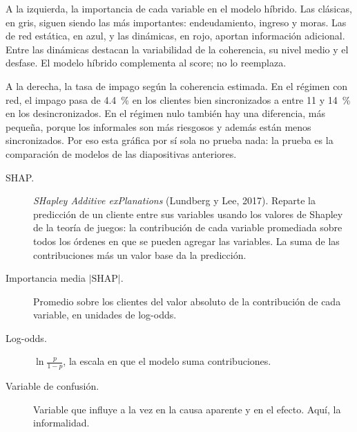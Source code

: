 \begin{decir}
A la izquierda, la importancia de cada variable en el modelo híbrido. Las clásicas,
en gris, siguen siendo las más importantes: endeudamiento, ingreso y moras. Las de red
estática, en azul, y las dinámicas, en rojo, aportan información adicional. Entre las
dinámicas destacan la variabilidad de la coherencia, su nivel medio y el desfase. El
modelo híbrido complementa al score; no lo reemplaza.

A la derecha, la tasa de impago según la coherencia estimada. En el régimen con red, el
impago pasa de 4.4~\% en los clientes bien sincronizados a entre 11 y 14~\% en los
desincronizados. En el régimen nulo también hay una diferencia, más pequeña, porque los
informales son más riesgosos y además están menos sincronizados. Por eso esta gráfica
por sí sola no prueba nada: la prueba es la comparación de modelos de las diapositivas
anteriores.
\end{decir}
\begin{terminos}
\begin{description}
\item[SHAP.] \emph{SHapley Additive exPlanations} (Lundberg y Lee, 2017). Reparte la
predicción de un cliente entre sus variables usando los valores de Shapley de la teoría
de juegos: la contribución de cada variable promediada sobre todos los órdenes en que se
pueden agregar las variables. La suma de las contribuciones más un valor base da la
predicción.
\item[Importancia media $|\mathrm{SHAP}|$.] Promedio sobre los clientes del valor
absoluto de la contribución de cada variable, en unidades de log-odds.
\item[Log-odds.] $\ln\frac{p}{1-p}$, la escala en que el modelo suma contribuciones.
\item[Variable de confusión.] Variable que influye a la vez en la causa aparente y en el
efecto. Aquí, la informalidad.
\end{description}
\end{terminos}
\begin{preguntas}
\end{preguntas}


